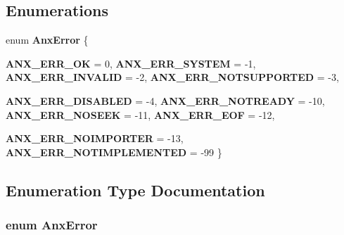 \subsection*{Enumerations}
\begin{CompactItemize}
\item 
enum {\bf Anx\-Error} \{ \par
{\bf ANX\_\-ERR\_\-OK} =  0, 
{\bf ANX\_\-ERR\_\-SYSTEM} =  -1, 
{\bf ANX\_\-ERR\_\-INVALID} =  -2, 
{\bf ANX\_\-ERR\_\-NOTSUPPORTED} =  -3, 
\par
{\bf ANX\_\-ERR\_\-DISABLED} =  -4, 
{\bf ANX\_\-ERR\_\-NOTREADY} =  -10, 
{\bf ANX\_\-ERR\_\-NOSEEK} =  -11, 
{\bf ANX\_\-ERR\_\-EOF} =  -12, 
\par
{\bf ANX\_\-ERR\_\-NOIMPORTER} =  -13, 
{\bf ANX\_\-ERR\_\-NOTIMPLEMENTED} =  -99
 \}
\end{CompactItemize}


\subsection{Enumeration Type Documentation}
\subsubsection{\setlength{\rightskip}{0pt plus 5cm}enum {\bf Anx\-Error}}\label{anx__constants_8h_a25}


